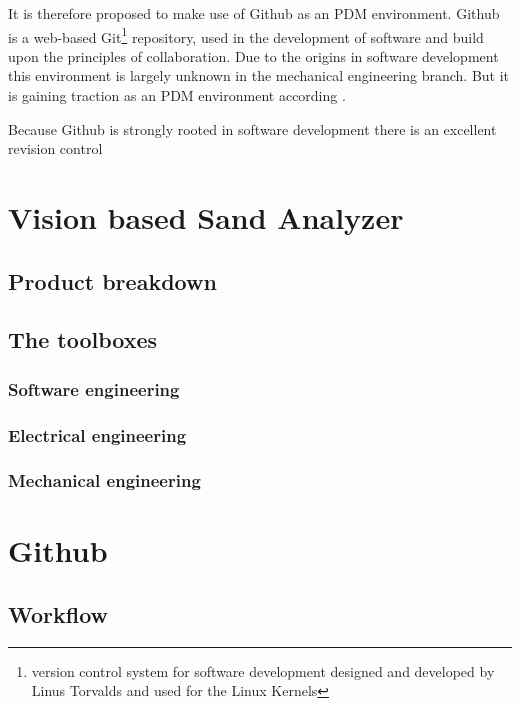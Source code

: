 \documentclass[fleqn,10pt]{SelfArx} %
\begin{document}
It is therefore proposed to make use of Github as an PDM environment. Github is a web-based Git\footnote{version control system for software development designed and developed by Linus Torvalds and used for the Linux Kernels} repository, used in the development of software and build upon the principles of collaboration. Due to the origins in software development this environment is largely unknown in the mechanical engineering branch. But it is gaining traction as an PDM environment according \citeauthor{oleg_github_2013}\cite{oleg_github_2013}. 

Because Github is strongly rooted in software development there is an excellent revision control



\section{Vision based Sand Analyzer}

\subsection{Product breakdown}

\subsection{The toolboxes}

\subsubsection{Software engineering}

\subsubsection{Electrical engineering}

\subsubsection{Mechanical engineering}

\section{Github}

\subsection{Workflow}
\end{document}
